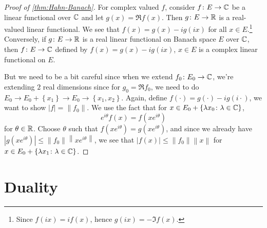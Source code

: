 \begin{proof}[Proof of \autoref{thm:Hahn-Banach}]
	For complex valued \(f\), consider \(f\colon E\to \mathbb{\MakeUppercase{c}} \) be a linear functional over \(\mathbb{\MakeUppercase{c}} \) and let \(g(x) = \Re f(x)\). Then \(g\colon E\to \mathbb{\MakeUppercase{r}} \) is a real-valued linear functional. We see that \(f(x) = g(x) - ig(ix)\) for all \(x\in E\).\footnote{Since \(f(ix) = if(x)\), hence \(g(ix) = -\Im f(x)\).} Conversely, if \(g\colon E\to \mathbb{\MakeUppercase{r}} \) is a real linear functional on Banach space \(E\) over \(\mathbb{\MakeUppercase{c}} \), then \(f\colon E\to \mathbb{\MakeUppercase{c}} \) defined by \(f(x) = g(x) - ig(ix)\), \(x\in E\) is a complex linear functional on \(E\).

	But we need to be a bit careful since when we extend \(f_0 \colon E_0 \to \mathbb{\MakeUppercase{c}} \), we're extending \(2\) real dimensions since for \(g_0 = \Re f_0\), we need to do \(E_0 \to E_0 + \left\{ x_1 \right\} \to E_0 \to \left\{ x_1, x_2 \right\} \). Again, define \(f(\cdot) = g(\cdot) - ig(i\cdot)\), we want to show \(\left\vert f \right\vert = \left\lVert f_0\right\rVert \). We use the fact that for \(x\in E_{0} + \left\{ \lambda x_0\colon \lambda \in \mathbb{\MakeUppercase{c}}  \right\}\),
	\[
		e^{i \theta }f(x) = f(x e^{i \theta })
	\]
	for \(\theta \in \mathbb{\MakeUppercase{r}} \). Choose \(\theta \) such that \(f(x e^{i \theta }) = g(x e^{i \theta })\), and since we already have \(\left\vert g(xe^{i \theta }) \right\vert \leq \left\lVert f_0\right\rVert \left\lVert x e^{i \theta }\right\rVert \), we see that \(\left\vert f(x) \right\vert \leq \left\lVert f_0\right\rVert \left\lVert x\right\rVert \) for \(x\in E_0 + \left\{ \lambda x_1 \colon \lambda \in \mathbb{\MakeUppercase{c}}  \right\} \).
\end{proof}

\chapter{Duality}


